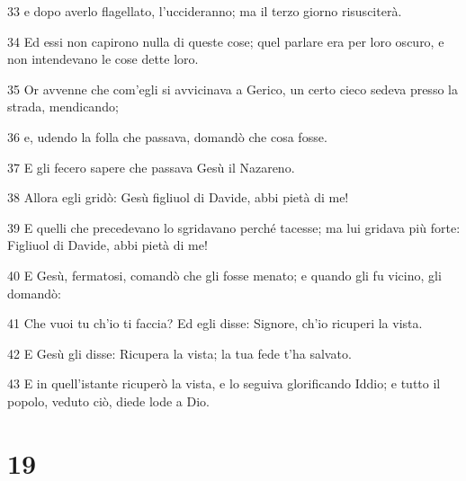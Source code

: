 \par 33 e dopo averlo flagellato, l'uccideranno; ma il terzo giorno risusciterà.
\par 34 Ed essi non capirono nulla di queste cose; quel parlare era per loro oscuro, e non intendevano le cose dette loro.
\par 35 Or avvenne che com'egli si avvicinava a Gerico, un certo cieco sedeva presso la strada, mendicando;
\par 36 e, udendo la folla che passava, domandò che cosa fosse.
\par 37 E gli fecero sapere che passava Gesù il Nazareno.
\par 38 Allora egli gridò: Gesù figliuol di Davide, abbi pietà di me!
\par 39 E quelli che precedevano lo sgridavano perché tacesse; ma lui gridava più forte: Figliuol di Davide, abbi pietà di me!
\par 40 E Gesù, fermatosi, comandò che gli fosse menato; e quando gli fu vicino, gli domandò:
\par 41 Che vuoi tu ch'io ti faccia? Ed egli disse: Signore, ch'io ricuperi la vista.
\par 42 E Gesù gli disse: Ricupera la vista; la tua fede t'ha salvato.
\par 43 E in quell'istante ricuperò la vista, e lo seguiva glorificando Iddio; e tutto il popolo, veduto ciò, diede lode a Dio.

\chapter{19}

